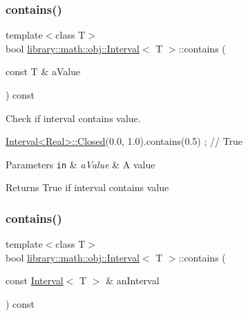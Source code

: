 \subsubsection{\texorpdfstring{contains()}{contains()}\hspace{0.1cm}{\footnotesize\ttfamily [1/2]}}
{\footnotesize\ttfamily template$<$class T$>$ \\
bool \hyperlink{classlibrary_1_1math_1_1obj_1_1_interval}{library\+::math\+::obj\+::\+Interval}$<$ T $>$\+::contains (\begin{DoxyParamCaption}\item[{const T \&}]{a\+Value }\end{DoxyParamCaption}) const}



Check if interval contains value. 


\begin{DoxyCode}
\hyperlink{classlibrary_1_1math_1_1obj_1_1_interval_aae8bb2b89af450729338d48563def4d7}{Interval<Real>::Closed}(0.0, 1.0).contains(0.5) ; \textcolor{comment}{// True}
\end{DoxyCode}



\begin{DoxyParams}[1]{Parameters}
\mbox{\tt in}  & {\em a\+Value} & A value \\
\hline
\end{DoxyParams}
\begin{DoxyReturn}{Returns}
True if interval contains value 
\end{DoxyReturn}
\mbox{\label{classlibrary_1_1math_1_1obj_1_1_interval_a3bace75e3cfb5f5c737e642c08572d25}} 
\subsubsection{\texorpdfstring{contains()}{contains()}\hspace{0.1cm}{\footnotesize\ttfamily [2/2]}}
{\footnotesize\ttfamily template$<$class T$>$ \\
bool \hyperlink{classlibrary_1_1math_1_1obj_1_1_interval}{library\+::math\+::obj\+::\+Interval}$<$ T $>$\+::contains (\begin{DoxyParamCaption}\item[{const \hyperlink{classlibrary_1_1math_1_1obj_1_1_interval}{Interval}$<$ T $>$ \&}]{an\+Interval }\end{DoxyParamCaption}) const}



